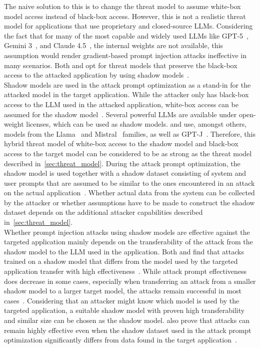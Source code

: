 The naive solution to this is to change the threat model to assume white-box model access instead of black-box access.
However, this is not a realistic threat model for applications that use proprietary and closed-source LLMs.
Considering the fact that for many of the most capable and widely used LLMs like GPT-5~\cite{openai_introducing_2026}, Gemini 3~\cite{google_new_2025}, and Claude 4.5~\cite{anthropic_claude_nodate}, the internal weights are not available, this assumption would render gradient-based prompt injection attacks ineffective in many scenarios.
Both \hui and \shi opt for threat models that preserve the black-box access to the attacked application by using shadow models~\cite{hui_pleak_2024, shi_optimization-based_2024}.\\

Shadow models are used in the attack prompt optimization as a stand-in for the attacked model in the target application.
While the attacker only has black-box access to the LLM used in the attacked application, white-box access can be assumed for the shadow model~\cite{hui_pleak_2024, shi_optimization-based_2024}.
Several powerful LLMs are available under open-weight licenses, which can be used as shadow models.
\hui and \shi use, amongst others, models from the Llama~\cite{meta-llama-3-8b-instruct_2024} and Mistral~\cite{mistral_mistral-7b-instruct-v02_2023} families, as well as GPT-J~\cite{wang_eleutheraigpt-j-6b_2023}. 
Therefore, this hybrid threat model of white-box access to the shadow model and black-box access to the target model can be considered to be as strong as the threat model described in~\cref{sec:threat_model}.
During the attack prompt optimization, the shadow model is used together with a shadow dataset consisting of system and user prompts that are assumed to be similar to the ones encountered in an attack on the actual application~\cite{hui_pleak_2024, shi_optimization-based_2024}.
Whether actual data from the system can be collected by the attacker or whether assumptions have to be made to construct the shadow dataset depends on the additional attacker capabilities described in~\cref{sec:threat_model}.\\

Whether prompt injection attacks using shadow models are effective against the targeted application mainly depends on the transferability of the attack from the shadow model to the LLM used in the application.
Both \hui and \shi find that attacks trained on a shadow model that differs from the model used by the targeted application transfer with high effectiveness~\cite{hui_pleak_2024, shi_optimization-based_2024}.
While attack prompt effectiveness does decrease in some cases, especially when transferring an attack from a smaller shadow model to a larger target model, the attacks remain successful in most cases~\cite{hui_pleak_2024, shi_optimization-based_2024}.
Considering that an attacker might know which model is used by the targeted application, a suitable shadow model with proven high transferability and similar size can be chosen as the shadow model.
\hui also prove that attacks can remain highly effective even when the shadow dataset used in the attack prompt optimization significantly differs from data found in the target application~\cite{hui_pleak_2024}.

